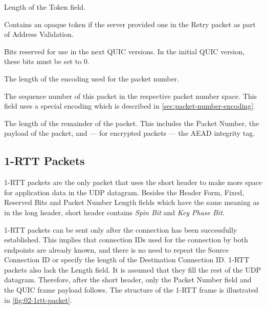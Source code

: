 \begin{description}

     Length of the Token field.

     Contains an opaque token if the server provided
    one in the Retry packet as part of Address Validation.

     Bits reserved for use in the next QUIC versions. In the initial QUIC
    version, these bits must be set to 0.

     The length of the encoding used for the packet number.

     The sequence number of this packet in the respective packet number space.
    This field uses a special encoding which is described in \autoref{sec:packet-number-encoding}.

     The length of the remainder of the packet. This includes the Packet Number,
    the payload of the packet, and --- for encrypted packets --- the AEAD integrity tag.

\end{description}

\subsection{1-RTT Packets}

1-RTT packets are the only packet that uses the short header to make more space for application data
in the UDP datagram. Besides the Header Form, Fixed, Reserved Bits and Packet Number Length fields
which have the same meaning as in the long header, short header contains \textit{Spin Bit} and
\textit{Key Phase Bit}.

1-RTT packets can be sent only after the connection has been successfully established. This implies
that connection IDs used for the connection by both endpoints are already known, and there is no
need to repeat the Source Connection ID or specify the length of the Destination Connection ID.
1-RTT packets also lack the Length field. It is assumed that they fill the rest of the UDP datagram.
Therefore, after the short header, only the Packet Number field and the QUIC frame payload follows.
The structure of the 1-RTT frame is illustrated in \autoref{fig:02-1rtt-packet}.

